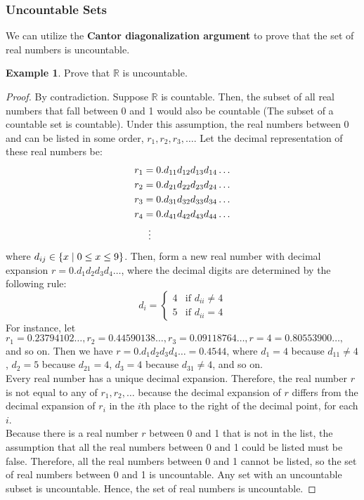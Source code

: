 \documentclass[article, 11pt]{article}
\theoremstyle{definition}
\newtheorem{example}{Example}
\DeclarePairedDelimiter\set{\{}{\}}
\newcommand{\reals}{\mathbb{R}}
\begin{document}
    \subsubsection{Uncountable Sets}
    We can utilize the \textbf{Cantor diagonalization argument} to prove that the set of real numbers is uncountable.
    \begin{example}
        Prove that $\reals$ is uncountable. 
        \begin{proof} By contradiction. 
            Suppose $\reals$ is countable. Then, the subset of all real numbers that fall between 0 and 1 would also be countable (The subset of a countable set is countable). Under this assumption, the real numbers between 0 and  can be listed in some order, $r_1, r_2, r_3, \dots$. Let the decimal representation of these real numbers be: 
            \begin{align*}
                r_1 &= 0.d_{11}d_{12}d_{13}d_{14}\dots \\
                r_2 &= 0.d_{21}d_{22}d_{23}d_{24}\dots \\
                r_3 &= 0.d_{31}d_{32}d_{33}d_{34}\dots \\
                r_4 &= 0.d_{41}d_{42}d_{43}d_{44}\dots \\
                    &\vdotswithin{=}
            \end{align*}
            where $d_{ij} \in \set*{x \mid 0 \leq x \leq 9}$. Then, form a new real number with decimal expansion $r=0.d_1d_2d_3d_4\dots$, where the decimal digits are determined by the following rule:
            \begin{equation*}
                d_i = \begin{cases}
                            4 & \text{if } d_{ii} \neq 4 \\
                            5 & \text{if } d_{ii} = 4
                        \end{cases}
            \end{equation*}
            For instance, let $r_1 = 0.23794102\dots, r_2=0.44590138\dots, r_3=0.09118764\dots, r=4=0.80553900\dots,$ and so on. Then we have $r=0.d_1d_2d_3d_4\dots=0.4544$, where $d_1=4$ because $d_{11} \neq 4$, $d_2=5$ because $d_{21}=4$, $d_3=4$ because $d_{31} \neq 4$, and so on. \\
            
            Every real number has a unique decimal expansion. Therefore, the real number $r$ is not equal to any of $r_1,r_2,\dots$ because the decimal expansion of $r$ differs from the decimal expansion of $r_i$ in the $i$th place to the right of the decimal point, for each $i$. \\

            Because there is a real number $r$ between 0 and 1 that is not in the list, the assumption that all the real numbers between 0 and 1 could be listed must be false. Therefore, all the real numbers between 0 and 1 cannot be listed, so the set of real numbers between 0 and 1 is uncountable. Any set with an uncountable subset is uncountable. Hence, the set of real numbers is uncountable.
        \end{proof}
    \end{example}
\end{document}
